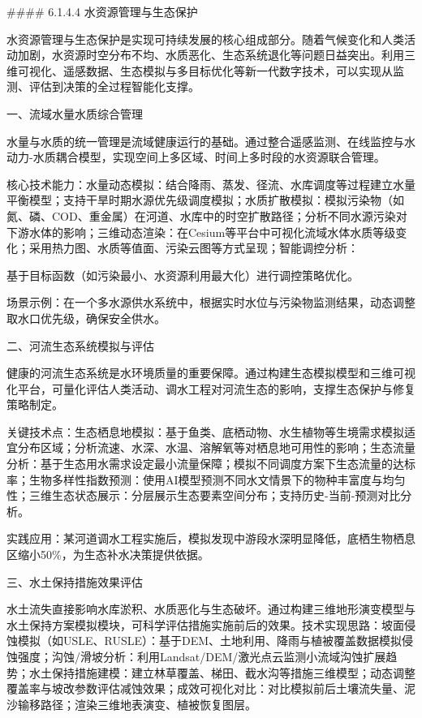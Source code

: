 \#\#\#\# 6.1.4.4 水资源管理与生态保护

水资源管理与生态保护是实现可持续发展的核心组成部分。随着气候变化和人类活动加剧，水资源时空分布不均、水质恶化、生态系统退化等问题日益突出。利用三维可视化、遥感数据、生态模拟与多目标优化等新一代数字技术，可以实现从监测、评估到决策的全过程智能化支撑。

一、流域水量水质综合管理

水量与水质的统一管理是流域健康运行的基础。通过整合遥感监测、在线监控与水动力-水质耦合模型，实现空间上多区域、时间上多时段的水资源联合管理。

核心技术能力：水量动态模拟：结合降雨、蒸发、径流、水库调度等过程建立水量平衡模型；支持干旱时期水源优先级调度模拟；水质扩散模拟：模拟污染物（如氮、磷、COD、重金属）在河道、水库中的时空扩散路径；分析不同水源污染对下游水体的影响；三维动态渲染：在Cesium等平台中可视化流域水体水质等级变化；采用热力图、水质等值面、污染云图等方式呈现；智能调控分析：

基于目标函数（如污染最小、水资源利用最大化）进行调控策略优化。

场景示例：在一个多水源供水系统中，根据实时水位与污染物监测结果，动态调整取水口优先级，确保安全供水。

二、河流生态系统模拟与评估

健康的河流生态系统是水环境质量的重要保障。通过构建生态模拟模型和三维可视化平台，可量化评估人类活动、调水工程对河流生态的影响，支撑生态保护与修复策略制定。

关键技术点：生态栖息地模拟：基于鱼类、底栖动物、水生植物等生境需求模拟适宜分布区域；分析流速、水深、水温、溶解氧等对栖息地可用性的影响；生态流量分析：基于生态用水需求设定最小流量保障；模拟不同调度方案下生态流量的达标率；生物多样性指数预测：使用AI模型预测不同水文情景下的物种丰富度与均匀性；三维生态状态展示：分层展示生态要素空间分布；支持历史-当前-预测对比分析。

实践应用：某河道调水工程实施后，模拟发现中游段水深明显降低，底栖生物栖息区缩小50\%，为生态补水决策提供依据。

三、水土保持措施效果评估

水土流失直接影响水库淤积、水质恶化与生态破坏。通过构建三维地形演变模型与水土保持方案模拟模块，可科学评估措施实施前后的效果。技术实现思路：坡面侵蚀模拟（如USLE、RUSLE）：基于DEM、土地利用、降雨与植被覆盖数据模拟侵蚀强度；沟蚀/滑坡分析：利用Landsat/DEM/激光点云监测小流域沟蚀扩展趋势；水土保持措施建模：建立林草覆盖、梯田、截水沟等措施三维模型；动态调整覆盖率与坡改参数评估减蚀效果；成效可视化对比：对比模拟前后土壤流失量、泥沙输移路径；渲染三维地表演变、植被恢复图层。

